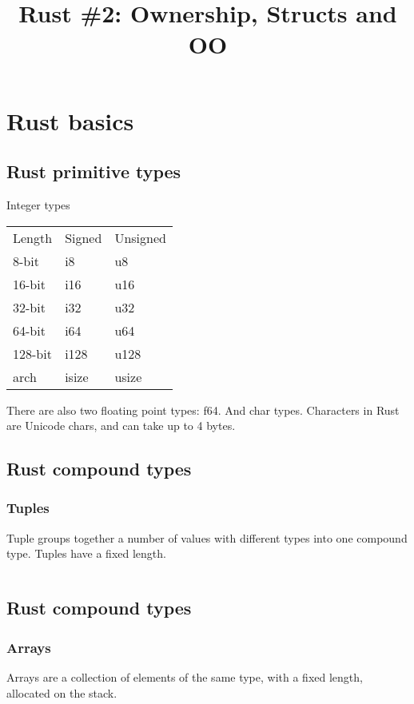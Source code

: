 \documentclass[usenames,twocolumn,dvipsnames,10pt,a4wide]{article}
\title{Rust \#2: Ownership, Structs and OO}
\begin{document}
\maketitle

\section{Rust basics}
\subsection{Rust primitive types} 
\large
Integer types
\begin{table}[]
\begin{tabular}{lll}
Length  & Signed & Unsigned \\
8-bit   & i8     & u8       \\
16-bit  & i16    & u16      \\
32-bit  & i32    & u32      \\
64-bit  & i64    & u64      \\
128-bit & i128   & u128     \\
arch    & isize  & usize    \\
\end{tabular}
\end{table}

There are also two floating point types:
f64.
And char types.
Characters in Rust are Unicode chars, and can take up to 4 bytes.


\subsection{Rust compound types}
\subsubsection{Tuples}
Tuple groups together a number of values with different
types into one compound type. Tuples have a fixed length.

\inputminted[fontsize=\normalsize]{rust}{code/tuple.rs}



\subsection{Rust compound types}
\subsubsection{Arrays}
Arrays are a collection of elements of the same type,
with a fixed length, allocated on the stack.
\end{document}
